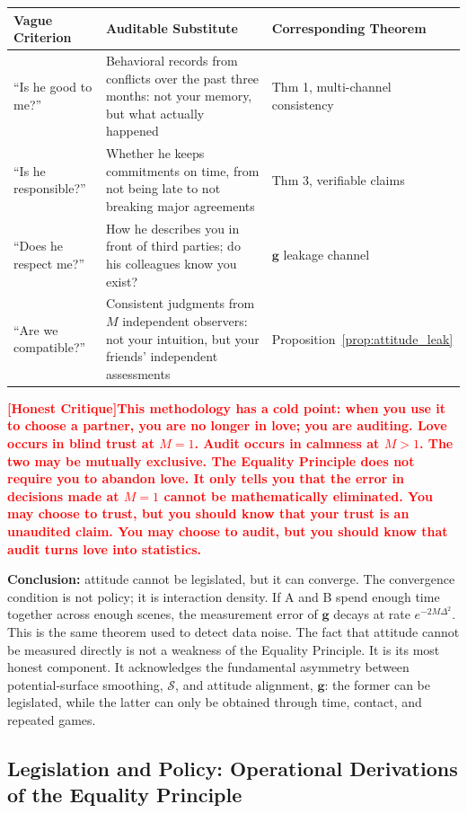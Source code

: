 \documentclass[12pt,a4paper]{article}
\theoremstyle{remark}
\newcommand{\honestcrit}[1]{%
    \textcolor{red}{\textbf{[Honest Critique]#1}}%
}
\begin{document}
\begin{center}
\begin{tabular}{p{4cm} p{5.5cm} p{5.5cm}}
\toprule
\textbf{Vague Criterion} & \textbf{Auditable Substitute} & \textbf{Corresponding Theorem} \\
\midrule
``Is he good to me?'' & Behavioral records from conflicts over the past three months: not your memory, but what actually happened & Thm 1, multi-channel consistency \\
``Is he responsible?'' & Whether he keeps commitments on time, from not being late to not breaking major agreements & Thm 3, verifiable claims \\
``Does he respect me?'' & How he describes you in front of third parties; do his colleagues know you exist? & $\mathbf{g}$ leakage channel \\
``Are we compatible?'' & Consistent judgments from $M$ independent observers: not your intuition, but your friends' independent assessments & Proposition~\ref{prop:attitude_leak} \\
\bottomrule
\end{tabular}
\end{center}

\honestcrit{This methodology has a cold point: when you use it to choose a partner, you are no longer in love; you are auditing. Love occurs in blind trust at $M=1$. Audit occurs in calmness at $M>1$. The two may be mutually exclusive. The Equality Principle does not require you to abandon love. It only tells you that the error in decisions made at $M=1$ cannot be mathematically eliminated. You may choose to trust, but you should know that your trust is an unaudited claim. You may choose to audit, but you should know that audit turns love into statistics.}

\textbf{Conclusion:} attitude cannot be legislated, but it can converge. The convergence condition is not policy; it is interaction density. If A and B spend enough time together across enough scenes, the measurement error of $\mathbf{g}$ decays at rate $e^{-2M\Delta^2}$. This is the same theorem used to detect data noise. The fact that attitude cannot be measured directly is not a weakness of the Equality Principle. It is its most honest component. It acknowledges the fundamental asymmetry between potential-surface smoothing, $\mathcal{S}$, and attitude alignment, $\mathbf{g}$: the former can be legislated, while the latter can only be obtained through time, contact, and repeated games.

\subsection{Legislation and Policy: Operational Derivations of the Equality Principle}
\end{document}
